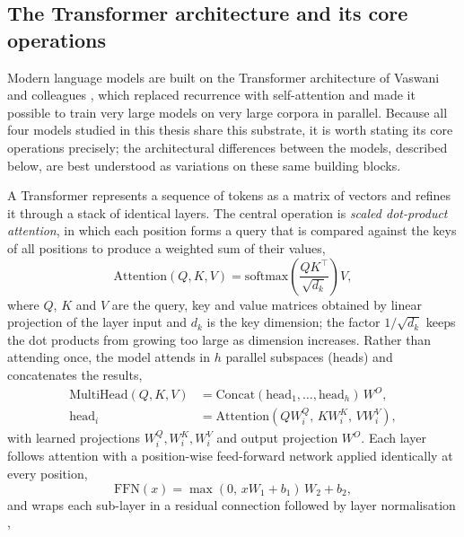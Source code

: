\subsection{The Transformer architecture and its core operations}
\label{sec:transformer-core}

Modern language models are built on the Transformer architecture of Vaswani and colleagues \cite{vaswani2017attention}, which replaced recurrence with self-attention and made it possible to train very large models on very large corpora in parallel. Because all four models studied in this thesis share this substrate, it is worth stating its core operations precisely; the architectural differences between the models, described below, are best understood as variations on these same building blocks.

A Transformer represents a sequence of tokens as a matrix of vectors and refines it through a stack of identical layers. The central operation is \emph{scaled dot-product attention}, in which each position forms a query that is compared against the keys of all positions to produce a weighted sum of their values,
\begin{equation}
\label{eq:attention}
\mathrm{Attention}(Q,K,V) = \mathrm{softmax}\!\left(\frac{QK^{\top}}{\sqrt{d_k}}\right)V,
\end{equation}
where $Q$, $K$ and $V$ are the query, key and value matrices obtained by linear projection of the layer input and $d_k$ is the key dimension; the factor $1/\sqrt{d_k}$ keeps the dot products from growing too large as dimension increases. Rather than attending once, the model attends in $h$ parallel subspaces (heads) and concatenates the results,
\begin{equation}
\label{eq:multihead}
\begin{aligned}
\mathrm{MultiHead}(Q,K,V) &= \mathrm{Concat}(\mathrm{head}_1,\dots,\mathrm{head}_h)\,W^{O}, \\
\mathrm{head}_i &= \mathrm{Attention}\!\left(QW_i^{Q},\, KW_i^{K},\, VW_i^{V}\right),
\end{aligned}
\end{equation}
with learned projections $W_i^{Q}, W_i^{K}, W_i^{V}$ and output projection $W^{O}$. Each layer follows attention with a position-wise feed-forward network applied identically at every position,
\begin{equation}
\label{eq:ffn}
\mathrm{FFN}(x) = \max(0,\, xW_1 + b_1)\,W_2 + b_2 ,
\end{equation}
and wraps each sub-layer in a residual connection followed by layer normalisation \cite{ba2016layernorm},

